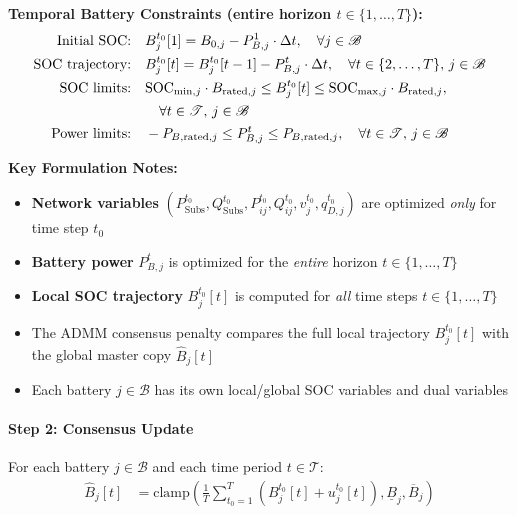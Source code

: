 \textbf{Temporal Battery Constraints (entire horizon $t \in \{1, \ldots, T\}$):}
\begin{align}
\text{Initial SOC:} \quad & B_j^{t_0}[1] = B_{0,j} - P_{B,j}^1 \cdot \Delta t, \quad \forall j \in \mathcal{B} \\
\text{SOC trajectory:} \quad & B_j^{t_0}[t] = B_j^{t_0}[t-1] - P_{B,j}^t \cdot \Delta t, \quad \forall t \in \{2, \ldots, T\}, \, j \in \mathcal{B} \\
\text{SOC limits:} \quad & \text{SOC}_{\min,j} \cdot B_{\text{rated},j} \leq B_j^{t_0}[t] \leq \text{SOC}_{\max,j} \cdot B_{\text{rated},j}, \notag \\
& \quad \forall t \in \mathcal{T}, \, j \in \mathcal{B} \\
\text{Power limits:} \quad & -P_{B,\text{rated},j} \leq P_{B,j}^t \leq P_{B,\text{rated},j}, \quad \forall t \in \mathcal{T}, \, j \in \mathcal{B}
\end{align}

\textbf{Key Formulation Notes:}
\begin{itemize}
    \item \textbf{Network variables} $(P_{\text{Subs}}^{t_0}, Q_{\text{Subs}}^{t_0}, P_{ij}^{t_0}, Q_{ij}^{t_0}, v_j^{t_0}, q_{D,j}^{t_0})$ are optimized \textit{only} for time step $t_0$
    \item \textbf{Battery power} $P_{B,j}^t$ is optimized for the \textit{entire} horizon $t \in \{1, \ldots, T\}$
    \item \textbf{Local SOC trajectory} $B_j^{t_0}[t]$ is computed for \textit{all} time steps $t \in \{1, \ldots, T\}$
    \item The ADMM consensus penalty compares the full local trajectory $B_j^{t_0}[t]$ with the global master copy $\hat{B}_j[t]$
    \item Each battery $j \in \mathcal{B}$ has its own local/global SOC variables and dual variables
\end{itemize}

\paragraph{Step 2: Consensus Update}
For each battery $j \in \mathcal{B}$ and each time period $t \in \mathcal{T}$:
\begin{align}
\hat{B}_j[t] &= \text{clamp}\left( \frac{1}{T} \sum_{t_0=1}^{T} \left( B_j^{t_0}[t] + u_j^{t_0}[t] \right), \underline{B}_j, \overline{B}_j \right)
\end{align}

